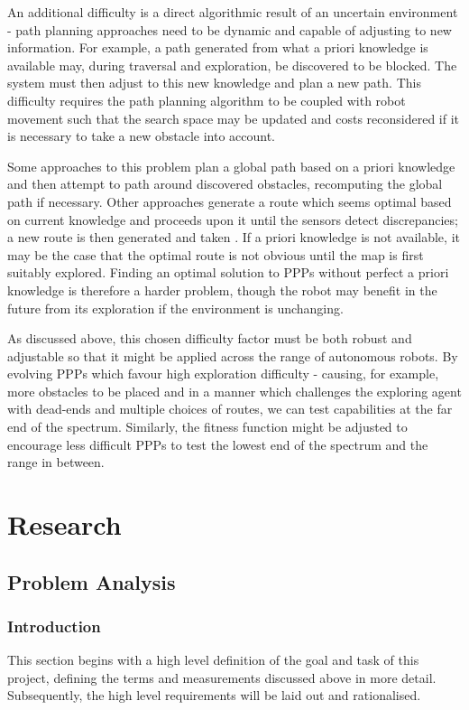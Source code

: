\documentclass[authoryearcitations]{UoYCSproject}
\begin{document}
An additional difficulty is a direct algorithmic result of an uncertain environment - path planning approaches need to be dynamic and capable of adjusting to new information. For example, a path generated from what a priori knowledge is available may, during traversal and exploration, be discovered to be blocked. The system must then adjust to this new knowledge and plan a new path. This difficulty requires the path planning algorithm to be coupled with robot movement such that the search space may be updated and costs reconsidered if it is necessary to take a new obstacle into account.

Some approaches to this problem plan a global path based on a priori knowledge and then attempt to path around discovered obstacles, recomputing the global path if necessary. Other approaches generate a route which seems optimal based on current knowledge and proceeds upon it until the sensors detect discrepancies; a new route is then generated and taken \cite{stentz}. If a priori knowledge is not available, it may be the case that the optimal route is not obvious until the map is first suitably explored. Finding an optimal solution to PPPs without perfect a priori knowledge is therefore a harder problem, though the robot may benefit in the future from its exploration if the environment is unchanging.

As discussed above, this chosen difficulty factor must be both robust and adjustable so that it might be applied across the range of autonomous robots. By evolving PPPs which favour high exploration difficulty - causing, for example, more obstacles to be placed and in a manner which challenges the exploring agent with dead-ends and multiple choices of routes, we can test capabilities at the far end of the spectrum.
Similarly, the fitness function might be adjusted to encourage less difficult PPPs to test the lowest end of the spectrum and the range in between.

\part{Research}
\label{sec:research}

\chapter{Problem Analysis}
\label{cha:ProbAnalysis}
\section{Introduction}
\label{sec:pa1}
This section begins with a high level definition of the goal and task of this project, defining the terms and measurements discussed above in more detail. Subsequently, the high level requirements will be laid out and rationalised.
\end{document}
